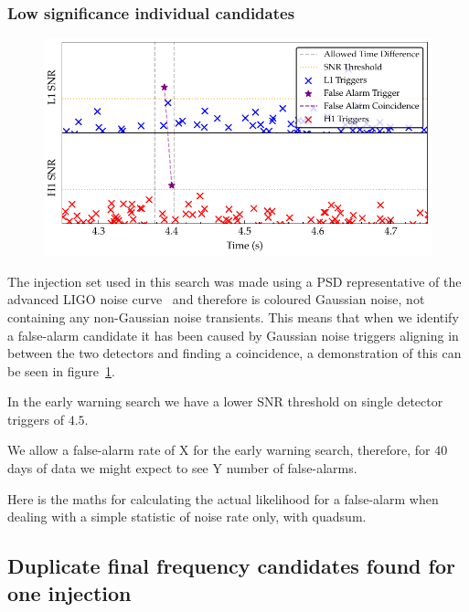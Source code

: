 \subsubsection{\label{6:sec:low-significance-cands}Low significance individual candidates}
%
\begin{figure}
       \centering
    \includegraphics[width=\textwidth]{images/6_earlywarning/identified-problems/low_sig_cands.pdf}
    \caption{}
    \label{6:fig:low_significance_candidates}
\end{figure}
%
The injection set used in this search was made using a PSD representative of the advanced LIGO noise curve~\cite{aLIGO_design_curve:2018} and therefore is coloured Gaussian noise, not containing any non-Gaussian noise transients. This means that when we identify a false-alarm candidate it has been caused by Gaussian noise triggers aligning in between the two detectors and finding a coincidence, a demonstration of this can be seen in figure~\ref{6:fig:low_significance_candidates}.

In the early warning search we have a lower SNR threshold on single detector triggers of $4.5$.

We allow a false-alarm rate of X for the early warning search, therefore, for $40$ days of data we might expect to see Y number of false-alarms.

Here is the maths for calculating the actual likelihood for a false-alarm when dealing with a simple statistic of noise rate only, with quadsum.





\subsection{\label{6:sec:duplicate-frequency-cands}Duplicate final frequency candidates found for one injection}

